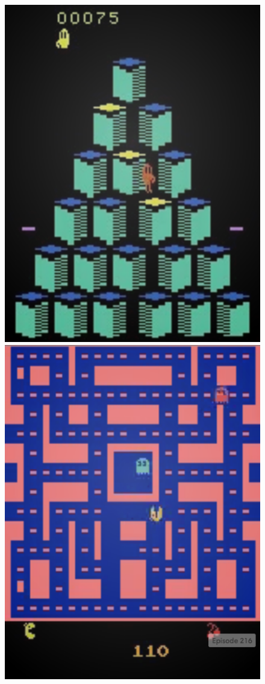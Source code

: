 \documentclass{article}
\begin{document}
    \begin{figure}[h]
        \centering
        \begin{minipage}{0.8\textwidth}
            \centering
            \includegraphics[scale=0.15]{Qbert}
            \centering
            \includegraphics[scale=0.15]{MsPacman}

\end{minipage}
\end{figure}
\end{document}
